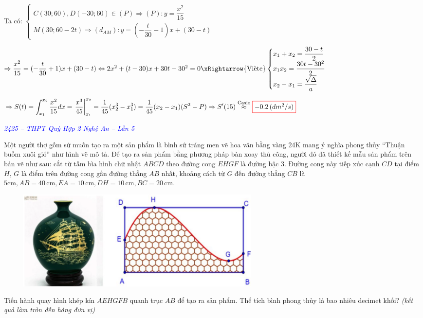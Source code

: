 \documentclass[twoside,final]{hcmut-report}
\newcommand{\exercise}[1]{\begin{exercisebox}#1\end{exercisebox}}
\newcommand{\result}[1]{\fcolorbox{red}{white}{#1}}
\renewcommand{\cite}[1]{``#1''}
\begin{document}
Ta có:
$\begin{cases}
        C(30; 60), D(-30;60)\in (P) \Rightarrow (P):y=\dfrac{x^2}{15} \\
        M(30; 60 - 2t) \Rightarrow (d_{AM}):y=(-\dfrac{t}{30}+1)x + (30-t)
    \end{cases}$\par
$\Rightarrow \dfrac{x^2}{15} = (-\dfrac{t}{30}+1)x + (30-t) \Leftrightarrow 2x^2 + (t - 30)x + 30t - 30^2 = 0 \xRightarrow{\text{Viète}}\begin{cases}
        x_1 + x_2 =\dfrac{30-t}{2}  \\
        x_1x_2 =\dfrac{30t-30^2}{2} \\
        x_2 - x_1 =\dfrac{\sqrt{\Delta}}{a}
    \end{cases}$\par
$\Rightarrow S(t) = \displaystyle \int_{x_1}^{x_2}\dfrac{x^2}{15}dx = \left. \frac{x^3}{45} \right|_{x_1}^{x_2} = \dfrac{1}{45}(x_2^3 - x_1^3) = \dfrac{1}{45}(x_2-x_1)(S^2 - P) \Rightarrow S'(15) \overset{\text{Casio}}{\approx} \result{$-0.2\,(dm^2/s)$}$
\exercise{
    \textcolor{blue}{\textit{2425 -- THPT Quỳ Hợp 2 Nghệ An -- Lần 5}}

    Một người thợ gốm sứ muốn tạo ra một sản phẩm là bình sứ tráng men vẽ hoa văn bằng vàng 24K mang ý nghĩa phong thủy \cite{Thuận buồm xuôi gió} như hình vẽ mô tả. Để tạo ra sản phẩm bằng phương pháp bàn xoay thủ công, người đó đã thiết kế mẫu sản phẩm trên bản vẽ như sau: cắt từ tấm bìa hình chữ nhật $ABCD$ theo đường cong $EHGF$ là đường bậc 3. Đường cong này tiếp xúc cạnh $CD$ tại điểm $H$, $G$ là điểm trên đường cong gần đường thẳng $AB$ nhất, khoảng cách từ $G$ đến đường thẳng $CB$ là $5\text{cm}, AB = 40\,\text{cm}, EA = 10\,\text{cm}, DH = 10\,\text{cm}, BC = 20\,\text{cm}$.

    \begin{figure}[H]
        \centering
        \includegraphics*[width=0.6\textwidth]{images/Ứng dụng tích phân/QH2.png}
    \end{figure}

    Tiến hành quay hình khép kín $AEHGFB$ quanh trục $AB$ để tạo ra sản phẩm. Thể tích bình phong thủy là bao nhiêu decimet khối? \textit{(kết quả làm tròn đến hàng đơn vị)}}
\end{document}
